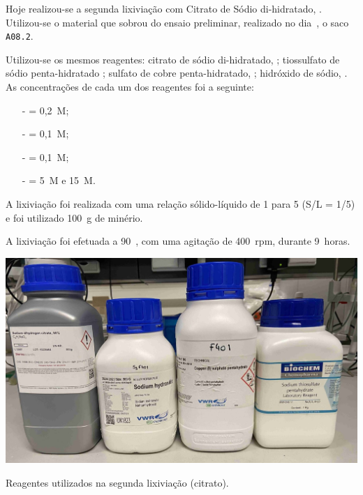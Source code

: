 \hrulefill

\label{day:11-dezembro-2024}

Hoje realizou-se a segunda lixiviação com Citrato de Sódio di-hidratado, \citratodi{}. Utilizou-se o material que sobrou do ensaio preliminar, realizado no dia~, o saco \texttt{A08.2}.

Utilizou-se os mesmos reagentes: citrato de sódio di-hidratado, \citratodi{}; tiossulfato de sódio penta-hidratado \tsp{}; sulfato de cobre penta-hidratado, \sulfcu{}; hidróxido de sódio, \hidso{}.
As concentrações de cada um dos reagentes foi a seguinte:

\begin{itemize}
    \item[-] \citratodi{} = 0,2~M;
    \item[-] \tsp{} = 0,1~M;
    \item[-] \sulfcu{} = 0,1~M;
    \item[-] \hidso{} = 5~M e 15~M.
\end{itemize}

A lixiviação foi realizada com uma relação sólido-líquido de 1 para 5 (S/L = 1/5) e foi utilizado 100~g de minério.

A lixiviação foi efetuada a 90~\graus{}, com uma agitação de 400~rpm, durante 9~horas.

\begin{marginfigure}
    \centering
    \includegraphics[width=0.9\linewidth]{figures/reagentes lixiviação citrato}
    \caption{Reagentes utilizados na segunda lixiviação (citrato).}
    \label{fig:reagentes-lix-citrato2}
\end{marginfigure}

